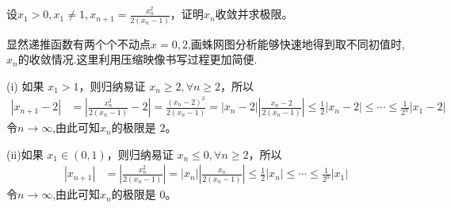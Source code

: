 \documentclass[../../main.tex]{subfiles}%
\begin{document}
\begin{example}
设\(x_1>0,x_1\neq1,x_{n + 1}=\frac{x_n^2}{2(x_n - 1)}\)，证明\(x_n\)收敛并求极限。
\end{example}
\begin{note}
显然递推函数有两个个不动点$x=0,2$,画蛛网图分析能够快速地得到取不同初值时,$x_n$的收敛情况.这里利用压缩映像书写过程更加简便.
\end{note}
\begin{solution}

(i) 如果 \(x_1 > 1\)，则归纳易证 \(x_n \geqslant  2,\forall n\geqslant  2\)，所以
\begin{align*}
|x_{n + 1} - 2|&=\left|\frac{x_n^2}{2(x_n - 1)} - 2\right|=\frac{(x_n - 2)^2}{2(x_n - 1)}=|x_n - 2|\left|\frac{x_n - 2}{2(x_n - 1)}\right|\leqslant \frac{1}{2}|x_n - 2|\leqslant \cdots\leqslant \frac{1}{2^n}|x_1 - 2|
\end{align*}
令$n\to \infty$,由此可知$x_n$的极限是 \(2\)。

(ii)如果 \(x_1\in(0,1)\)，则归纳易证 \(x_n\leqslant 0,\forall n\geqslant  2\)，所以
\begin{align*}
|x_{n + 1}|&=\left|\frac{x_n^2}{2(x_n - 1)}\right|=|x_n|\left|\frac{x_n}{2(x_n - 1)}\right|\leqslant \frac{1}{2}|x_n|\leqslant \cdots\leqslant \frac{1}{2^n}|x_1|
\end{align*}
令$n\to \infty$,由此可知$x_n$的极限是 \(0\)。

\end{solution}
\end{document}

